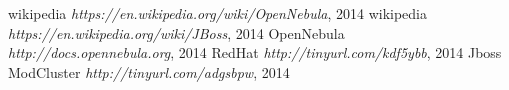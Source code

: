 \documentclass[11pt,a4paper]{article}
\begin{document}
\begin{thebibliography}{9}

  wikipedia
\emph{https://en.wikipedia.org/wiki/OpenNebula}, 2014
  wikipedia
\emph{https://en.wikipedia.org/wiki/JBoss}, 2014
  OpenNebula
\emph{http://docs.opennebula.org}, 2014
  RedHat
\emph{http://tinyurl.com/kdf5ybb}, 2014
  Jboss ModCluster
\emph{http://tinyurl.com/adgsbpw}, 2014


\end{thebibliography}
\end{document}
